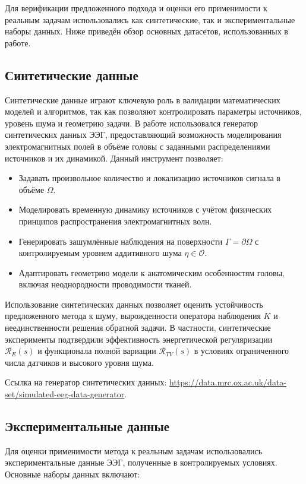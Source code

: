 \documentclass[sn-mathphys-num]{bst/sn-jnl}
\theoremstyle{thmstylethree}
\theoremstyle{thmstyletwo}
\theoremstyle{thmstyleone}
\begin{document}
Для верификации предложенного подхода и оценки его применимости к реальным задачам использовались как синтетические, так и экспериментальные наборы данных. Ниже приведён обзор основных датасетов, использованных в работе.

\subsection{Синтетические данные}

Синтетические данные играют ключевую роль в валидации математических моделей и алгоритмов, так как позволяют контролировать параметры источников, уровень шума и геометрию задачи. В работе использовался генератор синтетических данных ЭЭГ, предоставляющий возможность моделирования электромагнитных полей в объёме головы с заданными распределениями источников и их динамикой. Данный инструмент позволяет:

\begin{itemize}
    \item Задавать произвольное количество и локализацию источников сигнала в объёме $\Omega$.
    \item Моделировать временную динамику источников с учётом физических принципов распространения электромагнитных волн.
    \item Генерировать зашумлённые наблюдения на поверхности $\Gamma = \partial\Omega$ с контролируемым уровнем аддитивного шума $\eta \in \mathcal{O}$.
    \item Адаптировать геометрию модели к анатомическим особенностям головы, включая неоднородности проводимости тканей.
\end{itemize}

Использование синтетических данных позволяет оценить устойчивость предложенного метода к шуму, вырожденности оператора наблюдения $K$ и неединственности решения обратной задачи. В частности, синтетические эксперименты подтвердили эффективность энергетической регуляризации $\mathcal{R}_E(s)$ и функционала полной вариации $\mathcal{R}_{TV}(s)$ в условиях ограниченного числа датчиков и высокого уровня шума.

Ссылка на генератор синтетических данных: \url{https://data.mrc.ox.ac.uk/data-set/simulated-eeg-data-generator}.

\subsection{Экспериментальные данные}

Для оценки применимости метода к реальным задачам использовались экспериментальные данные ЭЭГ, полученные в контролируемых условиях. Основные наборы данных включают:
\end{document}
